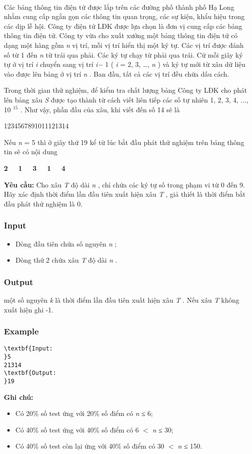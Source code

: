 

 

Các bảng thông tin điện tử được lắp trên các đường phố thành phố Hạ Long nhằm cung cấp ngắn gọn các thông tin quan trọng, các sự kiện, khẩu hiệu trong các dịp lễ hội. Công ty điện tử LĐK được lựa chọn là đơn vị cung cấp các bảng thông tin điện tử. Công ty vừa cho xuất xưởng một bảng thông tin điện tử có dạng một hàng gồm \emph{ n } vị trí, mỗi vị trí hiển thị một ký tự. Các vị trí được đánh số từ 1 đến \emph{ n } từ trái qua phải. Các ký tự chạy từ phải qua trái. Cứ mỗi giây ký tự ở vị trí \emph{ i } chuyển sang vị trí \emph{ i− } 1 ( \emph{ i } = 2, 3, …, \emph{ n } ) và ký tự mới từ xâu dữ liệu vào được lên bảng ở vị trí \emph{ n } . Ban đầu, tất cả các vị trí đều chứa dấu cách.

Trong thời gian thử nghiệm, để kiểm tra chất lượng bảng Công ty LĐK cho phát lên bảng xâu \emph{ S } được tạo thành từ cách viết liên tiếp các số tự nhiên 1, 2, 3, 4, ..., 10 $^ 15 $ . Như vậy, phần đầu của xâu, khi viết đến số 14 sẽ là

1234567891011121314

Nếu \emph{ n } = 5 thì ở giây thứ 19 kể từ lúc bắt đầu phát thử nghiệm trên bảng thông tin sẽ có nội dung

\textbf{2   1   3   1   4 }

\textbf{Yêu cầu: } Cho xâu \emph{ T } độ dài \emph{ n } , chỉ chứa các ký tự số trong phạm vi từ 0 đến 9. Hãy xác định thời điểm lần đầu tiên xuất hiện xâu \emph{ T } , giả thiết là thời điểm bắt đầu phát thử nghiệm là 0.

\subsubsection{Input}
\begin{itemize}
	\item Dòng đầu tiên chứa số nguyên \emph{ n } ;
	\item Dòng thứ 2 chứa xâu \emph{ T } độ dài \emph{ n } .
\end{itemize}

\subsubsection{Output}

một số nguyên \emph{ k } là thời điểm lần đầu tiên xuất hiện xâu \emph{ T } . Nếu xâu \emph{ T } không xuất hiện ghi -1.

\subsubsection{Example}
\begin{verbatim}
\textbf{Input:
}5
21314
\textbf{Output:
}19 
\end{verbatim}

\textbf{\textbf{Ghi chú:}}
\begin{itemize}
	\item Có 20\% số test ứng với 20\% số điểm có \emph{n }≤ 6;
	\item Có 40\% số test ứng với 40\% số điểm có 6 $<$ \emph{n} ≤ 30;
	\item Có 40\% số test còn lại ứng với 40\% số điểm có 30 $<$ \emph{n} ≤ 150.
\end{itemize}